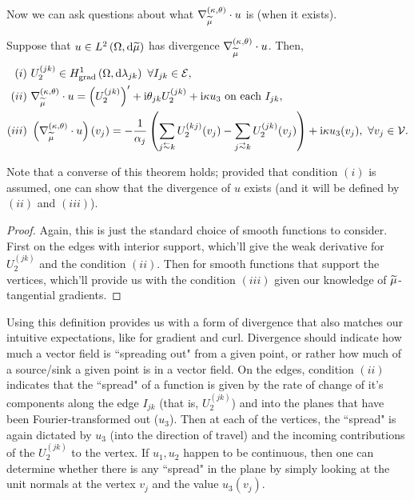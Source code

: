 \documentclass[11pt]{report}
\newcommand{\ktdiv}[1]{\ktgrad_{#1}\cdot}
\begin{document}
Now we can ask questions about what $\ktdiv{\dddmes}u$ is (when it exists).
\begin{prop}
	Suppose that $u\in L^{2}\left( \Omega,\mathrm{d}\widetilde{\mu} \right)$ has divergence $\ktdiv{\dddmes}u$.
	Then,
	\begin{align*}
		(i) \ & U_2^{(jk)} \in\gradSob{\ddom}{\lambda_{jk}} \ \forall I_{jk}\in\edgeSet, \\
		(ii) \ & \ktdiv{\dddmes}u = \bracs{U_2^{(jk)}}' + \rmi\qm_{jk}U_2^{(jk)} + \rmi\wavenumber u_3 \ \text{on each } I_{jk}, \\
		(iii) \ & \bracs{\ktdiv{\dddmes}u}(v_j) = -\recip{\alpha_j}\bracs{ \sum_{j\conRight k}U_2^{(kj)}(v_j) - \sum_{j\conLeft k}U_2^{(jk)}(v_j) } + \rmi\wavenumber u_3(v_j), \ \forall v_j\in\vertSet.
	\end{align*}
\end{prop}
Note that a converse of this theorem holds; provided that condition $(i)$ is assumed, one can show that the divergence of $u$ exists (and it will be defined by $(ii)$ and $(iii)$).
\begin{proof}
	Again, this is just the standard choice of smooth functions to consider.
	First on the edges with interior support, which'll give the weak derivative for $U_2^{(jk)}$ and the condition $(ii)$.
	Then for smooth functions that support the vertices, which'll provide us with the condition $(iii)$ given our knowledge of $\widetilde{\mu}$-tangential gradients.
\end{proof}

Using this definition provides us with a form of divergence that also matches our intuitive expectations, like for gradient and curl.
Divergence should indicate how much a vector field is ``spreading out" from a given point, or rather how much of a source/sink a given point is in a vector field.
On the edges, condition $(ii)$ indicates that the ``spread" of a function is given by the rate of change of it's components along the edge $I_{jk}$ (that is, $U_2^{(jk)}$) and into the planes that have been Fourier-transformed out ($u_3$).
Then at each of the vertices, the ``spread" is again dictated by $u_3$ (into the direction of travel) and the incoming contributions of the $U_2^{(jk)}$ to the vertex.
If $u_1, u_2$ happen to be continuous, then one can determine whether there is any ``spread" in the plane by simply looking at the unit normals at the vertex $v_j$ and the value $u_3(v_j)$.
\end{document}
